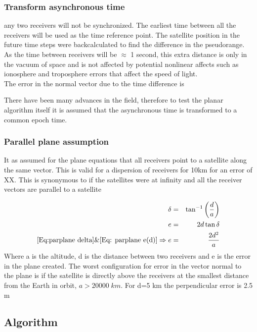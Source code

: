 \subsubsection{Transform asynchronous time}
any two receivers will not be synchronized. The earliest time between all the receivers will be used as the time reference point. The satellite position in the future time steps were backcalculated to find the difference in the pseudorange. As the time between receivers will be $\approx$ 1 second, this extra distance is only in the vacuum of space and is not affected by potential nonlinear affects such as ionosphere and troposphere errors that affect the speed of light.\\

The error in the normal vector due to the time difference is

There have been many advances in the field, therefore to test the planar algorithm itself it is assumed that the asynchronous time is transformed to a common epoch time.

\subsubsection{Parallel plane assumption}
It as assumed for the plane equations that all receivers point to a satellite along the same vector. This is valid for a dispersion of receivers for 10km for an error of XX. This is synonymous to if the satellites were at infinity and all the receiver vectors are parallel to a satellite



\begin{eqnarray}
\delta &=& \tan^{-1}\left(\frac{d}{a}\right) \label{Eq:parplane delta}\\
e &=& 2d\tan\delta \label{Eq: parplane e(d)}\\
\eqref{Eq:parplane delta} \& \eqref{Eq: parplane e(d)}\Rightarrow e&=&\frac{2d^2}{a}
\end{eqnarray}
Where a is the altitude, d is the distance between two receivers and e is the error in the plane created. The worst configuration for error in the vector normal to the plane is if the satellite is directly above the receivers at the smallest distance from the Earth in orbit, $a>20000\;km$. For d=5 km the perpendicular error is 2.5 m




\subsection{Algorithm}


